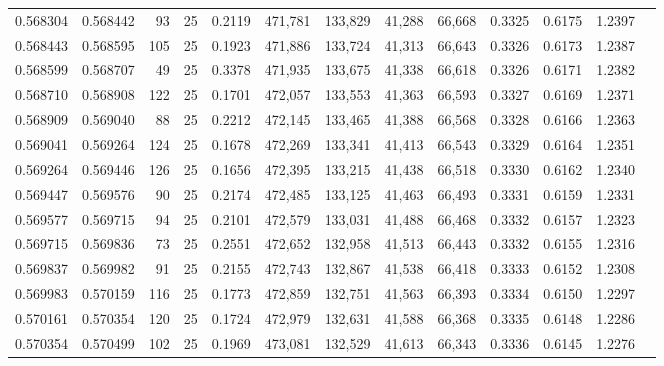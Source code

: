 \begin{tabular}{rrrrrrrrrrrrr}
0.568304 & 0.568442 &    93 &  25 &                                     0.2119 & 471,781 & 133,829 &  41,288 &  66,668 & 0.3325 & 0.6175 & 1.2397 \\
0.568443 & 0.568595 &   105 &  25 &                                     0.1923 & 471,886 & 133,724 &  41,313 &  66,643 & 0.3326 & 0.6173 & 1.2387 \\
0.568599 & 0.568707 &    49 &  25 &                                     0.3378 & 471,935 & 133,675 &  41,338 &  66,618 & 0.3326 & 0.6171 & 1.2382 \\
0.568710 & 0.568908 &   122 &  25 &                                     0.1701 & 472,057 & 133,553 &  41,363 &  66,593 & 0.3327 & 0.6169 & 1.2371 \\
0.568909 & 0.569040 &    88 &  25 &                                     0.2212 & 472,145 & 133,465 &  41,388 &  66,568 & 0.3328 & 0.6166 & 1.2363 \\
0.569041 & 0.569264 &   124 &  25 &                                     0.1678 & 472,269 & 133,341 &  41,413 &  66,543 & 0.3329 & 0.6164 & 1.2351 \\
0.569264 & 0.569446 &   126 &  25 &                                     0.1656 & 472,395 & 133,215 &  41,438 &  66,518 & 0.3330 & 0.6162 & 1.2340 \\
0.569447 & 0.569576 &    90 &  25 &                                     0.2174 & 472,485 & 133,125 &  41,463 &  66,493 & 0.3331 & 0.6159 & 1.2331 \\
0.569577 & 0.569715 &    94 &  25 &                                     0.2101 & 472,579 & 133,031 &  41,488 &  66,468 & 0.3332 & 0.6157 & 1.2323 \\
0.569715 & 0.569836 &    73 &  25 &                                     0.2551 & 472,652 & 132,958 &  41,513 &  66,443 & 0.3332 & 0.6155 & 1.2316 \\
0.569837 & 0.569982 &    91 &  25 &                                     0.2155 & 472,743 & 132,867 &  41,538 &  66,418 & 0.3333 & 0.6152 & 1.2308 \\
0.569983 & 0.570159 &   116 &  25 &                                     0.1773 & 472,859 & 132,751 &  41,563 &  66,393 & 0.3334 & 0.6150 & 1.2297 \\
0.570161 & 0.570354 &   120 &  25 &                                     0.1724 & 472,979 & 132,631 &  41,588 &  66,368 & 0.3335 & 0.6148 & 1.2286 \\
0.570354 & 0.570499 &   102 &  25 &                                     0.1969 & 473,081 & 132,529 &  41,613 &  66,343 & 0.3336 & 0.6145 & 1.2276 \\

\end{tabular}
